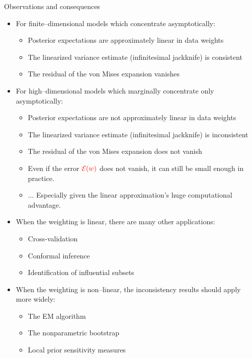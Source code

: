 \begin{frame}{Observations and consequences}



\begin{itemize}
\item For finite--dimensional models which concentrate asymptotically:
\begin{itemize}
    \item Posterior expectations are approximately linear in data weights
    \item The linearized variance estimate (infinitesimal jackknife) is consistent
    \item The residual of the von Mises expansion vanishes
\end{itemize}
\item For high--dimensional models which marginally concentrate only asymptotically:
\begin{itemize}
    \item Posterior expectations are not approximately linear in data weights
    \item The linearized variance estimate (infinitesimal jackknife) is inconsistent
    \item The residual of the von Mises expansion does not vanish
    \item Even if the error $\textcolor{red}{\mathcal{E}(w)}$ does not vanish,
            it can still be small enough in practice.
    \item[] ... Especially given the linear approximation's huge computational advantage.
\end{itemize}
\end{itemize}

\pause
\begin{itemize}
    \item When the weighting is linear, there are many other applications:
    \begin{itemize}
        \item Cross-validation
        \item Conformal inference
        \item Identification of influential subsets
    \end{itemize}
    \item When the weighting is non--linear, the inconsistency results 
    should apply more widely:
    \begin{itemize}
        \item The EM algorithm
        \item The nonparametric bootstrap
        \item Local prior sensitivity measures
    \end{itemize}
\end{itemize}


\end{frame}
